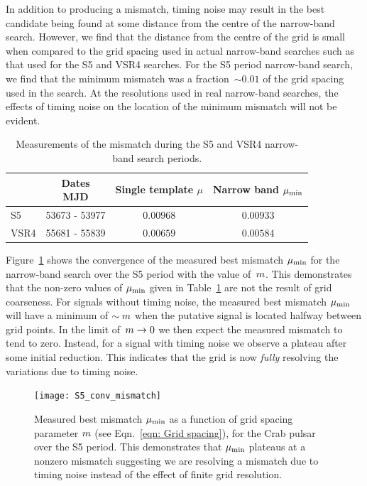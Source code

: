 \documentclass[../full_thesis/full_thesis.tex]{subfiles}
\begin{document}
In addition to producing a mismatch, timing noise may result in the best
candidate being found at some distance from the centre of the narrow-band
search.  However, we find that the distance from the centre of the grid is
small when compared to the grid spacing used in actual narrow-band searches
such as that used for the S5 and VSR4 searches. For the S5 period narrow-band search, we find that
the minimum mismatch was a fraction~$\sim 0.01$ of the grid spacing used in the
\citet{abbott2008beating} search.  At the resolutions used in real narrow-band searches,
the effects of timing noise on the location of the minimum mismatch will not be
evident.

\begingroup
\small
\begin{table}[ht]
\centering
\begin{tabular}{lccc}
    &
    \specialcell{Dates \\ MJD} &
    \specialcell{Single  template \\ $\mu$} &
    \specialcell{Narrow band \\ $\mu_{\mathrm{min}}$} \\ \hline
S5 & 53673 - 53977 & $0.00968$ & $0.00933$ \\
VSR4 & 55681 - 55839 & $0.00659$ & $0.00584$ \\
\end{tabular}
\caption{Measurements of the mismatch during the S5 and VSR4 narrow-band search
         periods.}
\label{tab: Results}
\end{table}
\endgroup

Figure~\ref{fig: conv} shows the convergence of the measured best mismatch
$\mu_{\mathrm{min}}$ for the narrow-band search over the S5 period with the value
of~$m$.  This demonstrates that the non-zero values of $\mu_{\mathrm{min}}$ given in
Table~\ref{tab: Results} are not the result of grid coarseness.  For signals
without timing noise, the measured best mismatch $\mu_{\mathrm{min}}$ will have a minimum
of $\sim m$ when the putative signal is located halfway between grid
points. In the limit of~$m \rightarrow 0$ we then expect the measured
mismatch to tend to zero. Instead, for a signal with timing noise we observe a
plateau after some initial reduction. This indicates that the grid is now
\emph{fully} resolving the variations due to timing noise.
\begin{figure}[htb]
\centering
\texttt{[image: S5\_conv\_mismatch]}
\caption{Measured best mismatch $\mu_{\mathrm{min}}$ as a function
of grid spacing parameter $m$ (see Eqn.~\eqref{eqn: Grid spacing}), for the Crab pulsar over the S5 period.
    This demonstrates that $\mu_{\mathrm{min}}$ plateaus at a nonzero mismatch suggesting
    we are resolving a mismatch due to timing noise instead of the effect of finite
    grid resolution.}
\label{fig: conv}
\end{figure}
\end{document}
